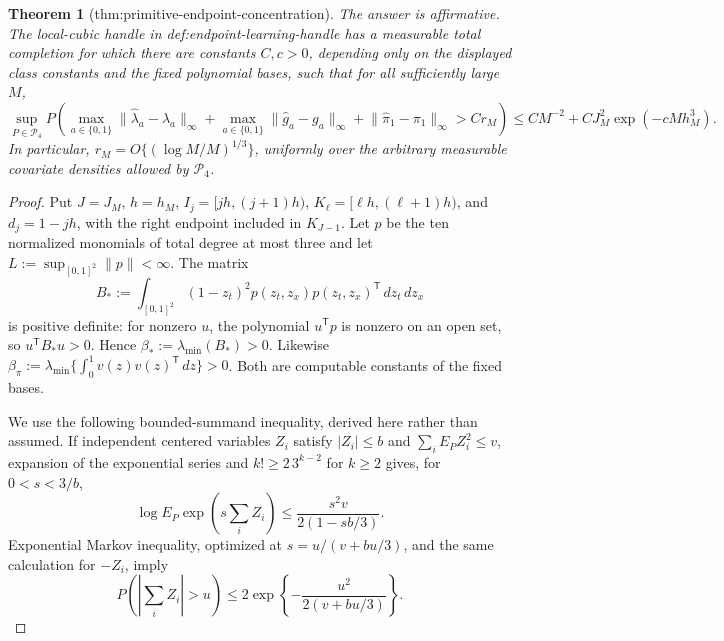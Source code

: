 \documentclass{article}
\newtheorem{theorem}{Theorem}
\begin{document}
\begin{theorem}[thm:primitive-endpoint-concentration]\label{thm:primitive-endpoint-concentration}
The answer is affirmative.  The local-cubic handle in def:endpoint-learning-handle has a measurable total completion for which there are constants \(C,c>0\), depending only on the displayed class constants and the fixed polynomial bases, such that for all sufficiently large \(M\),
\[
 \sup_{P\in\mathcal P_4}P\!\left(
 \max_{a\in\{0,1\}}\lVert\widehat\lambda_a-\lambda_a\rVert_\infty+
 \max_{a\in\{0,1\}}\lVert\widehat g_a-g_a\rVert_\infty+
 \lVert\widehat\pi_1-\pi_1\rVert_\infty>C r_M\right)
 \le C M^{-2}+C J_M^2\exp(-cMh_M^3).
\]
In particular, \(r_M=O\{(\log M/M)^{1/3}\}\), uniformly over the arbitrary measurable covariate densities allowed by \(\mathcal P_4\).
\end{theorem}
\begin{proof}
Put \(J=J_M\), \(h=h_M\), \(I_j=[jh,(j+1)h)\), \(K_\ell=[\ell h,(\ell+1)h)\), and \(d_j=1-jh\), with the right endpoint included in \(K_{J-1}\).  Let \(p\) be the ten normalized monomials of total degree at most three and let \(L:=\sup_{[0,1]^2}\lVert p\rVert<\infty\).  The matrix
\[
 B_*:=\int_{[0,1]^2}(1-z_t)^2p(z_t,z_x)p(z_t,z_x)^{\mathsf T}\,dz_t\,dz_x
\]
is positive definite: for nonzero \(u\), the polynomial \(u^{\mathsf T}p\) is nonzero on an open set, so \(u^{\mathsf T}B_*u>0\).  Hence \(\beta_*:=\lambda_{\min}(B_*)>0\).  Likewise \(\beta_\pi:=\lambda_{\min}\{\int_0^1v(z)v(z)^{\mathsf T}\,dz\}>0\).  Both are computable constants of the fixed bases.

We use the following bounded-summand inequality, derived here rather than assumed.  If independent centered variables \(Z_i\) satisfy \(|Z_i|\le b\) and \(\sum_iE_PZ_i^2\le v\), expansion of the exponential series and \(k!\ge2\,3^{k-2}\) for \(k\ge2\) gives, for \(0<s<3/b\),
\[
 \log E_P\exp\!\left(s\sum_iZ_i\right)
 \le\frac{s^2v}{2(1-sb/3)}.
\]
Exponential Markov inequality, optimized at \(s=u/(v+bu/3)\), and the same calculation for \(-Z_i\), imply
\[
 P\!\left(\left|\sum_iZ_i\right|>u\right)
 \le2\exp\!\left\{-\frac{u^2}{2(v+bu/3)}\right\}.                    \tag{C1}
\]


\end{proof}
\end{document}

